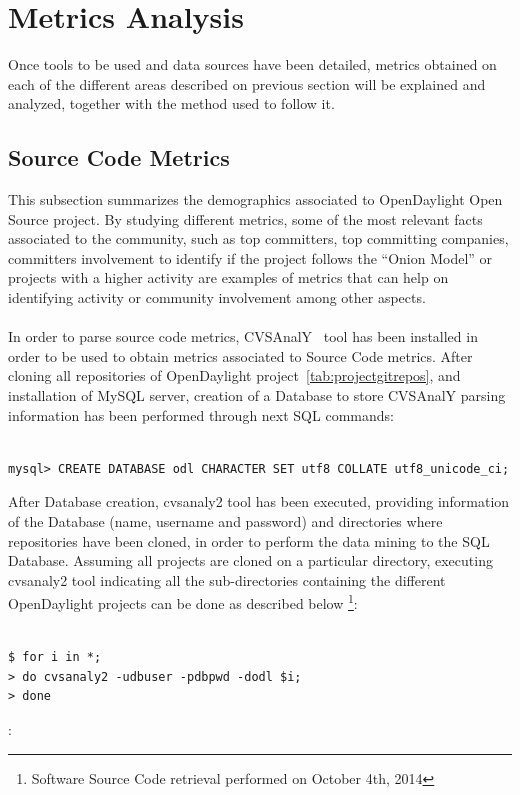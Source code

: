 \documentclass[a4paper, 12pt]{book}
\begin{document}
\section{Metrics Analysis}
\label{sec:odl_metrics_analysis}
Once tools to be used and data sources have been detailed, metrics obtained on each of the different areas described on previous section will be explained and analyzed, together with the method used to follow it.

\subsection{Source Code Metrics}
\label{subsec:odl_metrics_source_code}
This subsection summarizes the demographics associated to OpenDaylight Open Source project. By studying different metrics, some of the most relevant facts associated to the community, such as top committers, top committing companies, committers involvement to identify if the project follows the ``Onion Model'' or projects with a higher activity are examples of metrics that can help on identifying activity or community involvement among other aspects.\\
\\
In order to parse source code metrics, CVSAnalY~\cite{CVSAnalY} tool has been installed in order to be used to obtain metrics associated to Source Code metrics. After cloning all repositories of OpenDaylight project~\ref{tab:projectgitrepos}, and installation of MySQL server, creation of a Database to store CVSAnalY parsing information has been performed through next SQL commands:
\begin{verbatim}

mysql> CREATE DATABASE odl CHARACTER SET utf8 COLLATE utf8_unicode_ci;

\end{verbatim}
After Database creation, cvsanaly2 tool has been executed, providing information of the Database (name, username and password) and directories where repositories have been cloned, in order to perform the data mining to the SQL Database. Assuming all projects are cloned on a particular directory, executing cvsanaly2 tool indicating all the sub-directories containing the different OpenDaylight projects can be done as described below \footnote{Software Source Code retrieval performed on October 4th, 2014}:
\begin{verbatim}

$ for i in *;
> do cvsanaly2 -udbuser -pdbpwd -dodl $i;
> done

\end{verbatim}
:
\end{document}
